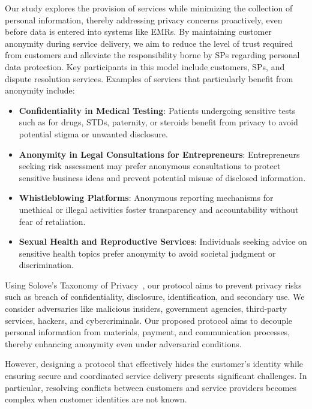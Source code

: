 \documentclass[pdftex,twocolumn,epjc3]{svjour3}
\begin{document}
\begin{sloppypar}
Our study explores the provision of services while minimizing the collection of personal information, thereby addressing privacy concerns proactively, even before data is entered into systems like EMRs. By maintaining customer anonymity during service delivery, we aim to reduce the level of trust required from customers and alleviate the responsibility borne by SPs regarding personal data protection. Key participants in this model include customers, SPs, and dispute resolution services. Examples of services that particularly benefit from anonymity include:
\begin{itemize}

  \item \textbf{Confidentiality in Medical Testing}: Patients undergoing sensitive tests such as for drugs, STDs, paternity, or steroids benefit from privacy to avoid potential stigma or unwanted disclosure.

  \item \textbf{Anonymity in Legal Consultations for Entrepreneurs}: Entrepreneurs seeking risk assessment may prefer anonymous consultations to protect sensitive business ideas and prevent potential misuse of disclosed information.

  \item \textbf{Whistleblowing Platforms}: Anonymous reporting mechanisms for unethical or illegal activities foster transparency and accountability without fear of retaliation.

  \item \textbf{Sexual Health and Reproductive Services}: Individuals seeking advice on sensitive health topics prefer anonymity to avoid societal judgment or discrimination.
\end{itemize}
\end{sloppypar}

\begin{sloppypar}
Using Solove's Taxonomy of Privacy~\cite{soloveTaxonomyPrivacy2006}, our protocol aims to prevent privacy risks such as breach of confidentiality, disclosure, identification, and secondary use. We consider adversaries like malicious insiders, government agencies, third-party services, hackers, and cybercriminals. Our proposed protocol aims to decouple personal information from materials, payment, and communication processes, thereby enhancing anonymity even under adversarial conditions.
\end{sloppypar}

\begin{sloppypar}
However, designing a protocol that effectively hides the customer's identity while ensuring secure and coordinated service delivery presents significant challenges.  In particular, resolving conflicts between customers and service providers becomes complex when customer identities are not known.
\end{sloppypar}
\end{document}
